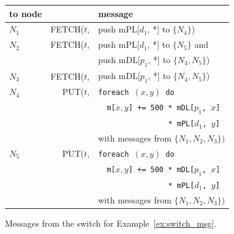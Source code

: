 

\begin{figure}
\begin{center}
\begin{tabular}{l|r@{~}l}
to node & & message \\
\hline
$N_1$ & FETCH($t$, & push mPL[$d_1$, *] to $\{N_4\}$) \\[.7ex]
$N_2$ & FETCH($t$, & push mPL[$d_1$, *] to $\{N_5\}$ and \\
      &            & push mDL[$p_1$, *] to $\{N_4, N_5\}$) \\[.7ex]
$N_3$ & FETCH($t$, & push mDL[$p_1$, *] to $\{N_4, N_5\}$) \\[.7ex]
$N_4$ & PUT($t$,   & {\tt foreach $(x,y)$ do} \\
      &            & ~~{\tt m[$x,y$] += 500 * mDL[$p_1$, $x$]} \\
      &            & ~~{\tt ~~~~~~~~~~~~~ * mPL[$d_1$, $y$]} \\
      &            & with messages from $\{N_1, N_2, N_3\})$ \\[.7ex]
$N_5$ & PUT($t$,   & {\tt foreach $(x,y)$ do} \\
      &            & ~~{\tt m[$x,y$] += 500 * mDL[$p_1$, $x$]} \\
      &            & ~~{\tt ~~~~~~~~~~~~~ * mPL[$d_1$, $y$]} \\
      &            & with messages from $\{N_1, N_2, N_3\})$
\end{tabular}
\end{center}

\vspace{-4mm}

\caption{Messages from the switch for Example~\ref{ex:switch_msg}.}
\label{fig:switch_msg}
\end{figure}



